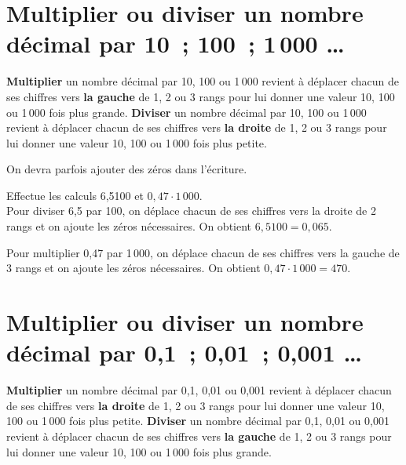 \section{Multiplier ou diviser un nombre décimal par 10 ; 100 ; 1\,000 \ldots}

\begin{aconnaitre}
\textbf{Multiplier} un nombre décimal par 10, 100 ou 1\,000 revient à déplacer chacun de ses chiffres vers \textbf{la gauche} de 1, 2 ou 3 rangs pour lui donner une valeur 10, 100 ou 1\,000 fois plus grande.
\textbf{Diviser} un nombre décimal par 10, 100 ou 1\,000 revient à déplacer chacun de ses chiffres vers \textbf{la droite} de 1, 2 ou 3 rangs pour lui donner une valeur 10, 100 ou 1\,000 fois plus petite.
\end{aconnaitre}

\begin{remarque}
On devra parfois ajouter des zéros dans l'écriture.
\end{remarque}

\begin{exemple*1}
Effectue les calculs 6,5100 et $0,47 \cdot 1\,000$.\\[1em]
Pour diviser 6,5 par 100, on déplace chacun de ses chiffres vers la droite de 2 rangs et on ajoute les zéros nécessaires. 
On obtient $6,5100 = 0,065$.

Pour multiplier 0,47 par 1\,000, on déplace chacun de ses chiffres vers la gauche de 3 rangs et on ajoute les zéros nécessaires. 
On obtient $0,47 \cdot 1\,000 = 470$. 
\end{exemple*1}



\section{Multiplier ou diviser un nombre décimal par 0,1 ; 0,01 ; 0,001 \ldots}

\begin{aconnaitre}
\textbf{Multiplier} un nombre décimal par 0,1, 0,01 ou 0,001 revient à déplacer chacun de ses chiffres vers \textbf{la droite} de 1, 2 ou 3 rangs pour lui donner une valeur 10, 100 ou 1\,000 fois plus petite.
\textbf{Diviser} un nombre décimal par 0,1, 0,01 ou 0,001 revient à déplacer chacun de ses chiffres vers \textbf{la gauche} de 1, 2 ou 3 rangs pour lui donner une valeur 10, 100 ou 1\,000 fois plus grande.
\end{aconnaitre}

